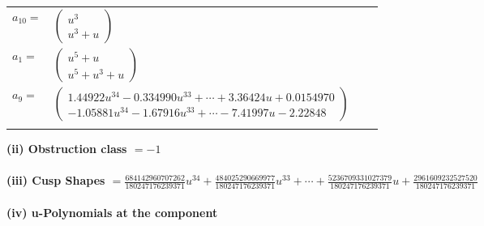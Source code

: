 \documentclass[1p]{elsarticle_modified}
\theoremstyle{definition}
\begin{document}
\begin{tabular}{m{7pt} m{180pt} m{7pt} m{180pt} }
\flushright $a_{10}=$&$\begin{pmatrix}u^3\\u^3+u\end{pmatrix}$ \\
\flushright $a_{1}=$&$\begin{pmatrix}u^5+u\\u^5+u^3+u\end{pmatrix}$ \\
\flushright $a_{9}=$&$\begin{pmatrix}1.44922 u^{34}-0.334990 u^{33}+\cdots+3.36424 u+0.0154970\\-1.05881 u^{34}-1.67916 u^{33}+\cdots-7.41997 u-2.22848\end{pmatrix}$\\&\end{tabular}
\flushleft \textbf{(ii) Obstruction class $= -1$}\\~\\
\flushleft \textbf{(iii) Cusp Shapes $= \frac{684142960707262}{180247176239371} u^{34}+\frac{484025290669977}{180247176239371} u^{33}+\cdots+\frac{5236709331027379}{180247176239371} u+\frac{2961609232527520}{180247176239371}$}\\~\\
\newpage\renewcommand{\arraystretch}{1}
\flushleft \textbf{(iv) u-Polynomials at the component}\newline \\
\end{document}
